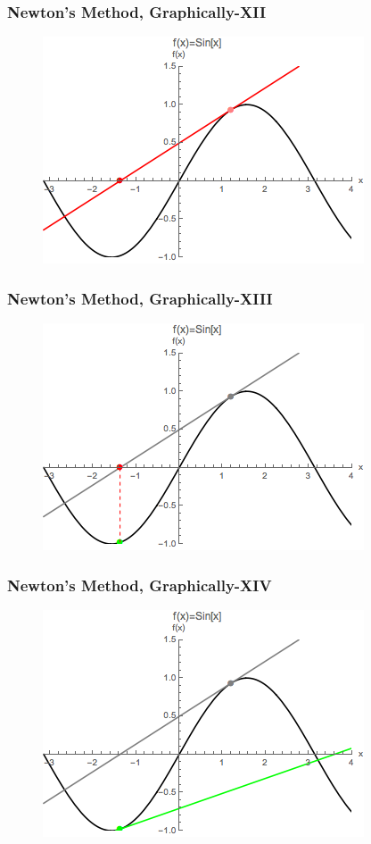 \documentclass{beamer}
\begin{document}
\begin{frame}
\frametitle[alignment=center]{Newton's Method, Graphically-XII}
\begin{figure}[htdb!]
\centering
\includegraphics[scale=0.8]{Newton_12.png}
\end{figure}
\end{frame}

\begin{frame}
\frametitle[alignment=center]{Newton's Method, Graphically-XIII}
\begin{figure}[htdb!]
\centering
\includegraphics[scale=0.8]{Newton_13.png}
\end{figure}
\end{frame}

\begin{frame}
\frametitle[alignment=center]{Newton's Method, Graphically-XIV}
\begin{figure}[htdb!]
\centering
\includegraphics[scale=0.8]{Newton_14.png}
\end{figure}
\end{frame}
\end{document}
